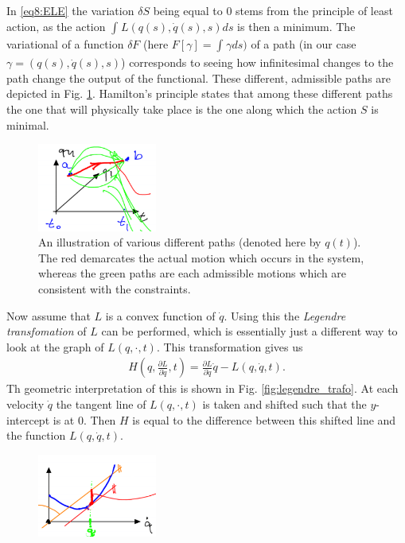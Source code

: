 \begin{ex}
\begin{remark}[]
	In \eqref{eq8:ELE} the variation $\delta S$ being equal to 0 stems from the principle of least action, as the action $\int_{}^{} L(q(s), \dot{q}(s), s)ds$ is then a minimum. The variational of a function $\delta F$ (here $F[\gamma]=\int_{}^{} \gamma ds)$ of a path (in our case $\gamma = (q(s), \dot{q}(s), s)$) corresponds to seeing how infinitesimal changes to the path change the output of the functional. These different, admissible paths are depicted in Fig. \ref{fig:variational_deriv}. Hamilton's principle states that among these different paths the one that will physically take place is the one along which the action $S$ is minimal.
	\begin{figure}[h!]
		\centering
		\includegraphics[width=0.35\textwidth]{figures/ch8/1variational_deriv.png}
		\caption{An illustration of various different paths (denoted here by $q(t)$). The red demarcates the actual motion which occurs in the system, whereas the green paths are each admissible motions which are consistent with the constraints.}
		\label{fig:variational_deriv}
	\end{figure}
\end{remark}
Now assume that $L$ is a convex function of $\dot{q}$. Using this the \emph{Legendre transfomation} of $L$ can be performed, which is essentially just a different way to look at the graph of $L(q, \cdot, t)$. This transformation gives us
\begin{align}
	\boxed{H\left(q, \frac{\partial L}{\partial \dot{q}}, t\right) = \frac{\partial L}{\partial \dot{q}}\dot{q} - L(q, \dot{q}, t).} \label{eq8:hamiltonian_def}
\end{align}
Th geometric interpretation of this is shown in Fig. \ref{fig:legendre_trafo}. At each velocity $\dot{q}$ the tangent line of $L(q, \cdot, t)$ is taken and shifted such that the $y$-intercept is at $0$. Then $H$ is equal to the difference between this shifted line and the function $L(q, \dot{q}, t)$.
\begin{figure}[h!]
	\centering
	\includegraphics[width=0.35\textwidth]{figures/ch8/2legendre_trafo.png}

\end{figure}
\end{ex}
